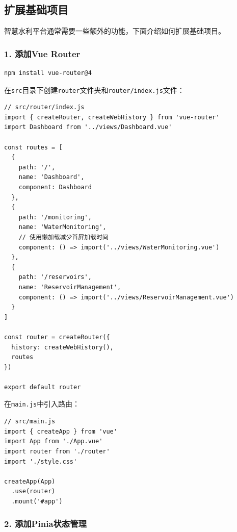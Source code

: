 \subsection{扩展基础项目}\label{ux6269ux5c55ux57faux7840ux9879ux76ee}

智慧水利平台通常需要一些额外的功能，下面介绍如何扩展基础项目。

\subsubsection{1. 添加Vue Router}\label{ux6dfbux52a0vue-router}

\begin{lstlisting}[language=bash]
npm install vue-router@4
\end{lstlisting}

在\passthrough{\lstinline!src!}目录下创建\passthrough{\lstinline!router!}文件夹和\passthrough{\lstinline!router/index.js!}文件：

\begin{lstlisting}
// src/router/index.js
import { createRouter, createWebHistory } from 'vue-router'
import Dashboard from '../views/Dashboard.vue'

const routes = [
  {
    path: '/',
    name: 'Dashboard',
    component: Dashboard
  },
  {
    path: '/monitoring',
    name: 'WaterMonitoring',
    // 使用懒加载减少首屏加载时间
    component: () => import('../views/WaterMonitoring.vue')
  },
  {
    path: '/reservoirs',
    name: 'ReservoirManagement',
    component: () => import('../views/ReservoirManagement.vue')
  }
]

const router = createRouter({
  history: createWebHistory(),
  routes
})

export default router
\end{lstlisting}

在\passthrough{\lstinline!main.js!}中引入路由：

\begin{lstlisting}
// src/main.js
import { createApp } from 'vue'
import App from './App.vue'
import router from './router'
import './style.css'

createApp(App)
  .use(router)
  .mount('#app')
\end{lstlisting}

\subsubsection{2.
添加Pinia状态管理}\label{ux6dfbux52a0piniaux72b6ux6001ux7ba1ux7406}

